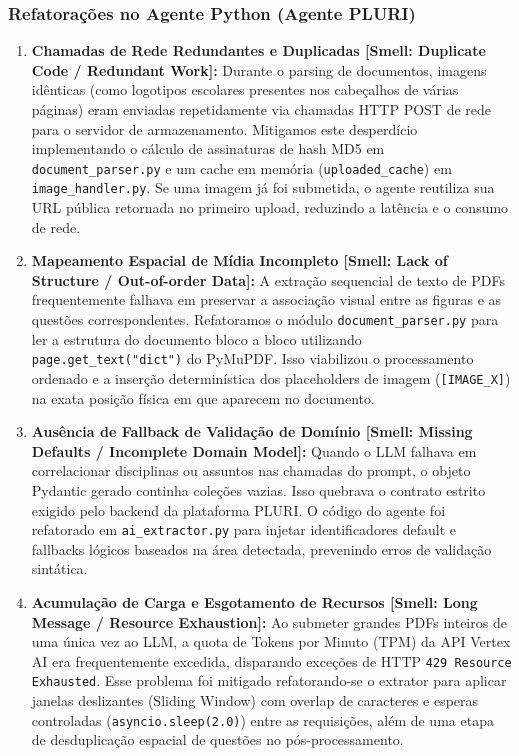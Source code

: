 \documentclass[sigconf]{acmart}
\begin{document}
\subsubsection{Refatorações no Agente Python (Agente PLURI)}
\begin{enumerate}
\item \textbf{Chamadas de Rede Redundantes e Duplicadas [Smell: Duplicate Code / Redundant Work]:} Durante o parsing de documentos, imagens idênticas (como logotipos escolares presentes nos cabeçalhos de várias páginas) eram enviadas repetidamente via chamadas HTTP POST de rede para o servidor de armazenamento. Mitigamos este desperdício implementando o cálculo de assinaturas de hash MD5 em \lstinline{document_parser.py} e um cache em memória (\lstinline{uploaded_cache}) em \lstinline{image_handler.py}. Se uma imagem já foi submetida, o agente reutiliza sua URL pública retornada no primeiro upload, reduzindo a latência e o consumo de rede.
\item \textbf{Mapeamento Espacial de Mídia Incompleto [Smell: Lack of Structure / Out-of-order Data]:} A extração sequencial de texto de PDFs frequentemente falhava em preservar a associação visual entre as figuras e as questões correspondentes. Refatoramos o módulo \lstinline{document_parser.py} para ler a estrutura do documento bloco a bloco utilizando \lstinline{page.get_text("dict")} do PyMuPDF. Isso viabilizou o processamento ordenado e a inserção determinística dos placeholders de imagem (\lstinline{[IMAGE_X]}) na exata posição física em que aparecem no documento.
\item \textbf{Ausência de Fallback de Validação de Domínio [Smell: Missing Defaults / Incomplete Domain Model]:} Quando o LLM falhava em correlacionar disciplinas ou assuntos nas chamadas do prompt, o objeto Pydantic gerado continha coleções vazias. Isso quebrava o contrato estrito exigido pelo backend da plataforma PLURI. O código do agente foi refatorado em \lstinline{ai_extractor.py} para injetar identificadores default e fallbacks lógicos baseados na área detectada, prevenindo erros de validação sintática.
\item \textbf{Acumulação de Carga e Esgotamento de Recursos [Smell: Long Message / Resource Exhaustion]:} Ao submeter grandes PDFs inteiros de uma única vez ao LLM, a quota de Tokens por Minuto (TPM) da API Vertex AI era frequentemente excedida, disparando exceções de HTTP \lstinline{429 Resource Exhausted}. Esse problema foi mitigado refatorando-se o extrator para aplicar janelas deslizantes (Sliding Window) com overlap de caracteres e esperas controladas (\lstinline{asyncio.sleep(2.0)}) entre as requisições, além de uma etapa de desduplicação espacial de questões no pós-processamento.
\end{enumerate}
\end{document}
